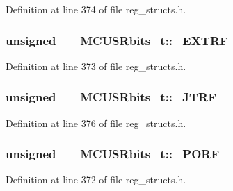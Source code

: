 Definition at line 374 of file reg\+\_\+structs.\+h.

\hypertarget{union_____m_c_u_s_rbits__t_abc22aba5b9f7852dbde1b1b8239c80f1}{
\subsubsection[{\+\_\+\+E\+X\+T\+R\+F}]{\setlength{\rightskip}{0pt plus 5cm}unsigned \+\_\+\+\_\+\+M\+C\+U\+S\+Rbits\+\_\+t\+::\+\_\+\+E\+X\+T\+R\+F}}\label{union_____m_c_u_s_rbits__t_abc22aba5b9f7852dbde1b1b8239c80f1}


Definition at line 373 of file reg\+\_\+structs.\+h.

\hypertarget{union_____m_c_u_s_rbits__t_a71034b0bea0cb3264ee499688aa745d8}{
\subsubsection[{\+\_\+\+J\+T\+R\+F}]{\setlength{\rightskip}{0pt plus 5cm}unsigned \+\_\+\+\_\+\+M\+C\+U\+S\+Rbits\+\_\+t\+::\+\_\+\+J\+T\+R\+F}}\label{union_____m_c_u_s_rbits__t_a71034b0bea0cb3264ee499688aa745d8}


Definition at line 376 of file reg\+\_\+structs.\+h.

\hypertarget{union_____m_c_u_s_rbits__t_a042a9e354d253aef9cc29275bbac0013}{
\subsubsection[{\+\_\+\+P\+O\+R\+F}]{\setlength{\rightskip}{0pt plus 5cm}unsigned \+\_\+\+\_\+\+M\+C\+U\+S\+Rbits\+\_\+t\+::\+\_\+\+P\+O\+R\+F}}\label{union_____m_c_u_s_rbits__t_a042a9e354d253aef9cc29275bbac0013}


Definition at line 372 of file reg\+\_\+structs.\+h.

